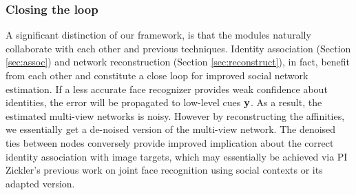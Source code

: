 
\subsubsection{Closing the loop}
\label{sec:closeloop}

A significant distinction of our framework, is that the modules naturally collaborate with each other and previous techniques. Identity association (Section \ref{sec:assoc}) and network reconstruction (Section \ref{sec:reconstruct}), in fact, benefit from each other and constitute a close loop for improved social network estimation. If a less accurate face recognizer provides weak confidence about identities, the error will be propagated to low-level cues ${\bf y}$. As a result, the estimated multi-view networks is noisy. However by reconstructing the affinities, we essentially get a de-noised version of the multi-view network. The denoised ties between nodes conversely provide improved implication about the correct identity association with image targets, which may essentially be achieved via PI Zickler's previous work on joint face recognition using social contexts \cite{Stone2008,Stone2010} or its adapted version. 
